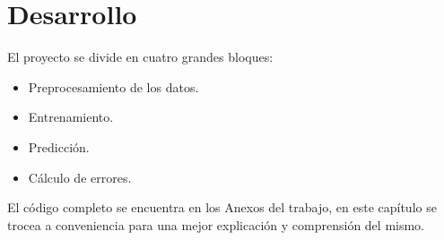 \chapter{Desarrollo}\label{cap4}

El proyecto se divide en cuatro grandes bloques:

\begin{itemize}
    \item Preprocesamiento de los datos.
    \item Entrenamiento.
    \item Predicción.
    \item Cálculo de errores.
\end{itemize}

El código completo se encuentra en los Anexos del trabajo, en este capítulo se trocea a conveniencia para una mejor explicación y comprensión del mismo.






